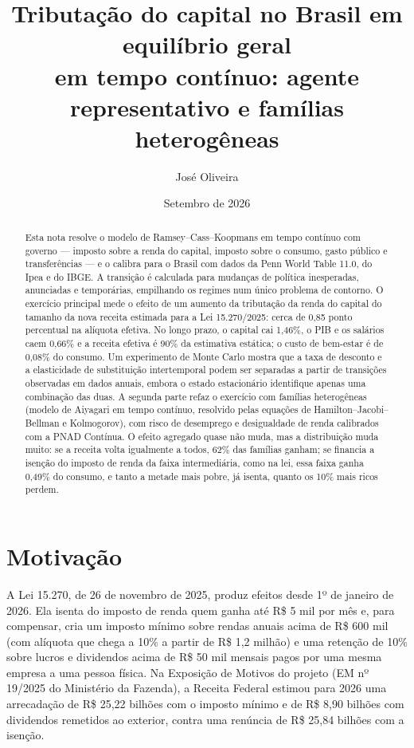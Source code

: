 \documentclass[11pt,a4paper]{article}
\title{Tributação do capital no Brasil em equilíbrio geral\\
em tempo contínuo: agente representativo e famílias heterogêneas}
\author{José Oliveira}
\date{Setembro de 2026}
\begin{document}
\maketitle

\begin{abstract}
Esta nota resolve o modelo de Ramsey--Cass--Koopmans em tempo contínuo com
governo --- imposto sobre a renda do capital, imposto sobre o consumo, gasto
público e transferências --- e o calibra para o Brasil com dados da Penn World
Table 11.0, do Ipea e do IBGE. A transição é calculada para mudanças de
política inesperadas, anunciadas e temporárias, empilhando os regimes num único
problema de contorno. O exercício principal mede o efeito de um aumento da
tributação da renda do capital do tamanho da nova receita estimada para a
Lei 15.270/2025: cerca de 0,85 ponto percentual na alíquota efetiva. No longo
prazo, o capital cai 1,46\%, o PIB e os salários caem 0,66\% e a receita
efetiva é 90\% da estimativa estática; o custo de bem-estar é de 0,08\% do
consumo. Um experimento de Monte Carlo mostra que a taxa de desconto e a
elasticidade de substituição intertemporal podem ser separadas a partir de
transições observadas em dados anuais, embora o estado estacionário identifique
apenas uma combinação das duas. A segunda parte refaz o exercício com famílias
heterogêneas (modelo de Aiyagari em tempo contínuo, resolvido pelas equações de
Hamilton--Jacobi--Bellman e Kolmogorov), com risco de desemprego e desigualdade
de renda calibrados com a PNAD Contínua. O efeito agregado quase não muda, mas
a distribuição muda muito: se a receita volta igualmente a todos, 62\% das
famílias ganham; se financia a isenção do imposto de renda da faixa
intermediária, como na lei, essa faixa ganha 0,49\% do consumo, e tanto a
metade mais pobre, já isenta, quanto os 10\% mais ricos perdem.
\end{abstract}

\section{Motivação}

A Lei 15.270, de 26 de novembro de 2025, produz efeitos desde 1º de janeiro
de 2026. Ela isenta do imposto de renda quem ganha até R\$ 5 mil por mês e,
para compensar, cria um imposto mínimo sobre rendas anuais acima de
R\$ 600 mil (com alíquota que chega a 10\% a partir de R\$ 1,2 milhão) e uma
retenção de 10\% sobre lucros e dividendos acima de R\$ 50 mil mensais pagos
por uma mesma empresa a uma pessoa física. Na Exposição de Motivos do projeto
(EM nº 19/2025 do Ministério da Fazenda), a Receita Federal estimou para 2026
uma arrecadação de R\$ 25,22 bilhões com o imposto mínimo e de R\$ 8,90 bilhões
com dividendos remetidos ao exterior, contra uma renúncia de R\$ 25,84 bilhões
com a isenção.
\end{document}
